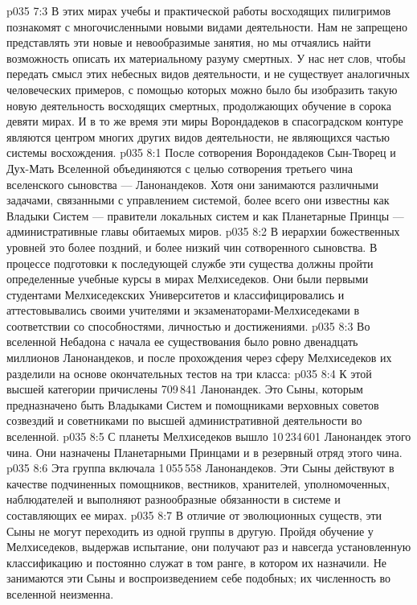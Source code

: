 \vs p035 7:3 В этих мирах учебы и практической работы восходящих пилигримов познакомят с многочисленными новыми видами деятельности. Нам не запрещено представлять эти новые и невообразимые занятия, но мы отчаялись найти возможность описать их материальному разуму смертных. У нас нет слов, чтобы передать смысл этих небесных видов деятельности, и не существует аналогичных человеческих примеров, с помощью которых можно было бы изобразить такую новую деятельность восходящих смертных, продолжающих обучение в сорока девяти мирах. И в то же время эти миры Ворондадеков в спасоградском контуре являются центром многих других видов деятельности, не являющихся частью системы восхождения.
\vs p035 8:1 После сотворения Ворондадеков Сын\hyp{}Творец и Дух\hyp{}Мать Вселенной объединяются с целью сотворения третьего чина вселенского сыновства --- Ланонандеков. Хотя они занимаются различными задачами, связанными с управлением системой, более всего они известны как Владыки Систем --- правители локальных систем и как Планетарные Принцы --- административные главы обитаемых миров.
\vs p035 8:2 В иерархии божественных уровней это более поздний, и более низкий чин сотворенного сыновства. В процессе подготовки к последующей службе эти существа должны пройти определенные учебные курсы в мирах Мелхиседеков. Они были первыми студентами Мелхиседекских Университетов и классифицировались и аттестовывались своими учителями и экзаменаторами\hyp{}Мелхиседеками в соответствии со способностями, личностью и достижениями.
\vs p035 8:3 Во вселенной Небадона с начала ее существования было ровно двенадцать миллионов Ланонандеков, и после прохождения через сферу Мелхиседеков их разделили на основе окончательных тестов на три класса:
\vs p035 8:4 \bibnobreakspace {} К этой высшей категории причислены 709\,841 Ланонандек. Это Сыны, которым предназначено быть Владыками Систем и помощниками верховных советов созвездий и советниками по высшей административной деятельности во вселенной.
\vs p035 8:5 \pc {}\bibnobreakspace {} С планеты Мелхиседеков вышло 10\,234\,601 Ланонандек этого чина. Они назначены Планетарными Принцами и в резервный отряд этого чина.
\vs p035 8:6 \pc {}\bibnobreakspace {} Эта группа включала 1\,055\,558 Ланонандеков. Эти Сыны действуют в качестве подчиненных помощников, вестников, хранителей, уполномоченных, наблюдателей и выполняют разнообразные обязанности в системе и составляющих ее мирах.
\vs p035 8:7 \pc В отличие от эволюционных существ, эти Сыны не могут переходить из одной группы в другую. Пройдя обучение у Мелхиседеков, выдержав испытание, они получают раз и навсегда установленную классификацию и постоянно служат в том ранге, в котором их назначили. Не занимаются эти Сыны и воспроизведением себе подобных; их численность во вселенной неизменна.
